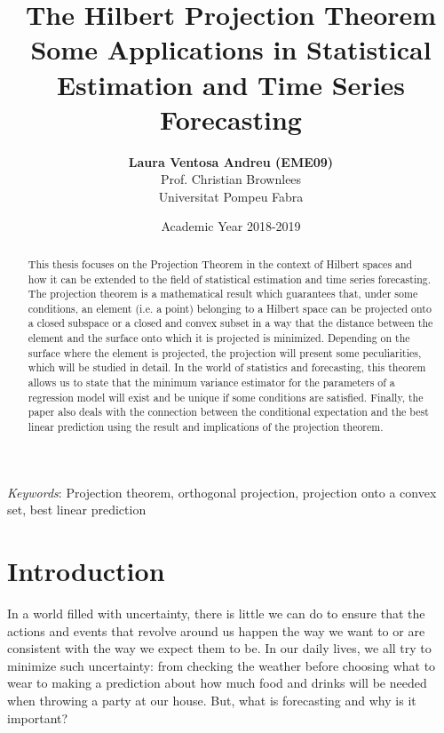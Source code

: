 \documentclass{article}
\begin{document}
\title{%
  \textbf{ \huge The Hilbert Projection Theorem \\
  \large Some Applications in Statistical Estimation and Time Series Forecasting}}

\author{\textbf{Laura Ventosa Andreu (EME09)} \\
Prof. Christian Brownlees \\
Universitat Pompeu Fabra}
\date{Academic Year 2018-2019}
\maketitle


\begin{abstract}
This thesis focuses on the Projection Theorem in the context of Hilbert spaces and how it can be extended to the field of statistical estimation and time series forecasting. The projection theorem is a mathematical result which guarantees that, under some conditions, an element (i.e. a point) belonging to a Hilbert space can be projected onto a closed subspace or a closed and convex subset in a way that the distance between the element and the surface onto which it is projected is minimized. Depending on the surface where the element is projected, the projection will present some peculiarities, which will be studied in detail. In the world of statistics and forecasting, this theorem allows us to state that the minimum variance estimator for the parameters of a regression model will exist and be unique if some conditions are satisfied. Finally, the paper also deals with the connection between the conditional expectation and the best linear prediction using the result and implications of the projection theorem. \newline
\end{abstract}

\textit{Keywords}: Projection theorem, orthogonal projection, projection onto a convex set, best linear prediction

\newpage

\tableofcontents

\newpage

\section{Introduction} 
In a world filled with uncertainty, there is little we can do to ensure that the actions and events that revolve around us happen the way we want to or are consistent with the way we expect them to be. In our daily lives, we all try to minimize such uncertainty: from checking the weather before choosing what to wear to making a prediction about how much food and drinks will be needed when throwing a party at our house. But, what is forecasting and why is it important? \newline
\end{document}
